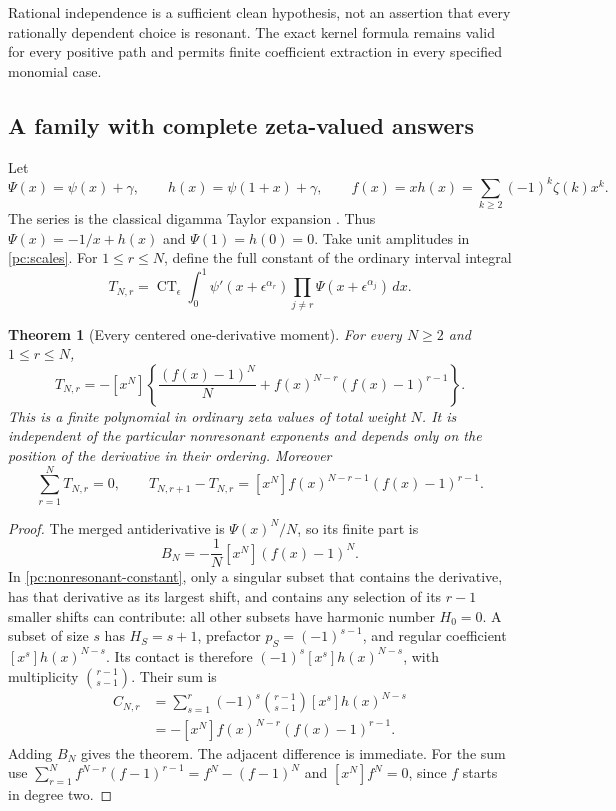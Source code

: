 \documentclass[11pt,a4paper]{article}
\newtheorem{theorem}{Theorem}[section]
\theoremstyle{definition}
\theoremstyle{remark}
\numberwithin{equation}{section}
\begin{document}
Rational independence is a sufficient clean hypothesis, not an assertion
that every rationally dependent choice is resonant.  The exact kernel
formula remains valid for every positive path and permits finite
coefficient extraction in every specified monomial case.

\subsection{A family with complete zeta-valued answers}

Let
\[
 \Psi(x)=\psi(x)+\gamma,\qquad
 h(x)=\psi(1+x)+\gamma,\qquad
 f(x)=xh(x)=\sum_{k\ge2}(-1)^k\zeta(k)x^k.
\]
The series is the classical digamma Taylor expansion
\cite[Eq.~5.7.4]{DLMF}.
Thus $\Psi(x)=-1/x+h(x)$ and $\Psi(1)=h(0)=0$.
Take unit amplitudes in \eqref{pc:scales}.  For $1\le r\le N$,
define the full constant of the ordinary interval integral
\begin{equation}\label{pc:T-def}
 T_{N,r}=\operatorname{CT}_{\epsilon}
       \int_0^1\psi'(x+\epsilon^{\alpha_r})
               \prod_{j\ne r}\Psi(x+\epsilon^{\alpha_j})\,dx.
\end{equation}

\begin{theorem}[Every centered one-derivative moment]
\label{pc:all-powers}
For every $N\ge2$ and $1\le r\le N$,
\begin{equation}\label{pc:all-powers-formula}
 \boxed{\displaystyle
 T_{N,r}=-[x^N]\left\{
           \frac{(f(x)-1)^N}{N}
               +f(x)^{N-r}(f(x)-1)^{r-1}\right\}.}
\end{equation}
This is a finite polynomial in ordinary zeta values of total weight $N$.
It is independent of the particular nonresonant exponents and depends
only on the position of the derivative in their ordering.  Moreover
\begin{equation}\label{pc:sum-jump}
 \sum_{r=1}^N T_{N,r}=0,\qquad
 T_{N,r+1}-T_{N,r}
       =[x^N]f(x)^{N-r-1}(f(x)-1)^{r-1}.
\end{equation}
\end{theorem}

\begin{proof}
The merged antiderivative is $\Psi(x)^N/N$, so its finite part is
\[
 B_N=-\frac1N[x^N](f(x)-1)^N.
\]
In \eqref{pc:nonresonant-constant}, only a singular subset that
contains the derivative, has that derivative as its largest shift,
and contains any selection of its $r-1$ smaller shifts can contribute:
all other subsets have harmonic number $H_0=0$.
A subset of size $s$ has $H_S=s+1$, prefactor $p_S=(-1)^{s-1}$,
and regular coefficient $[x^s]h(x)^{N-s}$.  Its contact is therefore
$(-1)^s[x^s]h(x)^{N-s}$, with multiplicity $\binom{r-1}{s-1}$.
Their sum is
\begin{align*}
 C_{N,r}
 &=\sum_{s=1}^r(-1)^s\binom{r-1}{s-1}
                           [x^s]h(x)^{N-s}\\
 &=-[x^N]f(x)^{N-r}(f(x)-1)^{r-1}.
\end{align*}
Adding $B_N$ gives the theorem.  The adjacent difference is immediate.
For the sum use
$\sum_{r=1}^N f^{N-r}(f-1)^{r-1}=f^N-(f-1)^N$ and
$[x^N]f^N=0$, since $f$ starts in degree two.
\end{proof}
\end{document}
